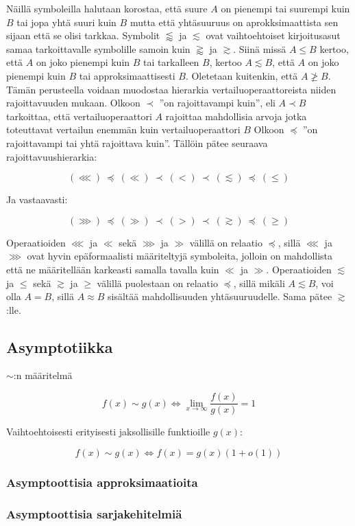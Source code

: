 \documentclass[../johdoksia.tex]{subfiles}
\begin{document}
	Näillä symboleilla halutaan korostaa, että suure $A$ on pienempi tai suurempi kuin $B$ tai jopa yhtä suuri kuin $B$ mutta että yhtäsuuruus on aprokksimaattista sen sijaan että se olisi tarkkaa. Symbolit $\lessapprox$ ja $\lesssim$ ovat vaihtoehtoiset kirjoitusasut samaa tarkoittavalle symbolille samoin kuin $\gtrapprox$ ja $\gtrsim$. Siinä missä $A \leq B$ kertoo, että $A$ on joko pienempi kuin $B$ tai tarkalleen $B$, kertoo $A \lesssim B$, että $A$ on joko pienempi kuin $B$ tai approksimaattisesti $B$. Oletetaan kuitenkin, että $A \not\geq B$. Tämän perusteella voidaan muodostaa hierarkia vertailuoperaattoreista niiden rajoittavuuden mukaan. Olkoon $\prec$ ''on rajoittavampi kuin'', eli $A \prec B$ tarkoittaa, että vertailuoperaattori $A$ rajoittaa mahdollisia arvoja jotka toteuttavat vertailun enemmän kuin vertailuoperaattori $B$ Olkoon $\preceq$ ''on rajoittavampi tai yhtä rajoittava kuin''. Tällöin pätee seuraava rajoittavuushierarkia:
	
	\begin{equation}
		(\lll) \ \preceq \ (\ll) \ \prec \ (<) \ \prec \ (\lesssim) \ \preceq \ (\leq)
	\end{equation}

	Ja vastaavasti:
	
	\begin{equation}
		(\ggg) \ \preceq \ (\gg) \ \prec \ (>) \ \prec \ (\gtrsim) \ \preceq \ (\geq)
	\end{equation}
	
	Operaatioiden $\lll$ ja $\ll$ sekä $\ggg$ ja $\gg$ välillä on relaatio $\preceq$, sillä $\lll$ ja $\ggg$ ovat hyvin epäformaalisti määriteltyjä symboleita, jolloin on mahdollista että ne määritellään karkeasti samalla tavalla kuin $\ll$ ja $\gg$. Operaatioiden $\lesssim$ ja $\leq$ sekä $\gtrsim$ ja $\geq$ välillä puolestaan on relaatio $\preceq$, sillä mikäli $A \lesssim B$, voi olla $A = B$, sillä $A \approx B$ sisältää mahdollisuuden yhtäsuuruudelle. Sama pätee $\gtrsim$:lle.
	
	\subsection{Asymptotiikka}
	
	$\sim$:n määritelmä
	
	\begin{equation}
		f(x) \sim g(x) \iff \lim_{x\to \infty}\frac{f(x)}{g(x)} = 1
	\end{equation}

	Vaihtoehtoisesti erityisesti jaksollisille funktioille $g(x)$:
	
	\begin{equation}
		f(x) \sim g(x) \iff f(x) = g(x)(1 + o(1))
	\end{equation}
	
	\subsubsection{Asymptoottisia approksimaatioita}
	
	\subsubsection{Asymptoottisia sarjakehitelmiä}
	
\end{document}
